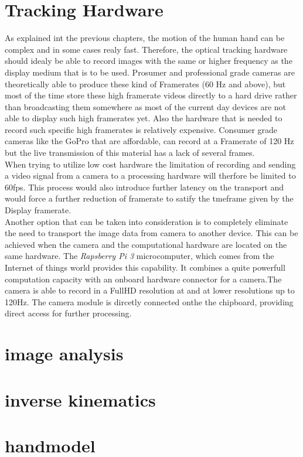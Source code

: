 \section{Tracking Hardware}
 As explained int the previous chapters, the motion of the human hand can be complex and in some cases realy fast. Therefore, the optical tracking hardware should idealy be able to record images with the same or higher frequency as the display medium that is to be used. Prosumer and professional grade cameras are theoretically able to produce these kind of Framerates (60 Hz and above), but most of the time store these high framerate videos directly to a hard drive rather than broadcasting them somewhere as most of the current day devices are not able to display such high framerates yet. Also the hardware that is needed to record such specific high framerates is relatively expensive. Consumer grade cameras like the GoPro that are affordable, can record at a Framerate of 120 Hz but the live transmission of this material has a lack of several frames.\\
When trying to utilize low cost hardware the limitation of recording and sending a video signal from a camera to a processing hardware will therfore be limited to 60fps. This process would also introduce further latency on the transport and would force a further reduction of framerate to satify the tmeframe given by the Display framerate.
\\Another option that can be taken into consideration is to completely eliminate the need to transport the image data from camera to another device. This can be achieved when the camera and the computational hardware are located on the same hardware. The \textit{Rapsberry Pi 3} microcomputer, which comes from the Internet of things world provides this capability. It combines a quite powerfull computation capacity with an onboard hardware connector for a camera.The camera is able to record in a FullHD resolution at  and at lower resolutions up to 120Hz. The camera module is dircetly connected onthe the chipboard, providing direct access for further processing.
\section{image analysis}
\section{inverse kinematics}
\section{handmodel}
 